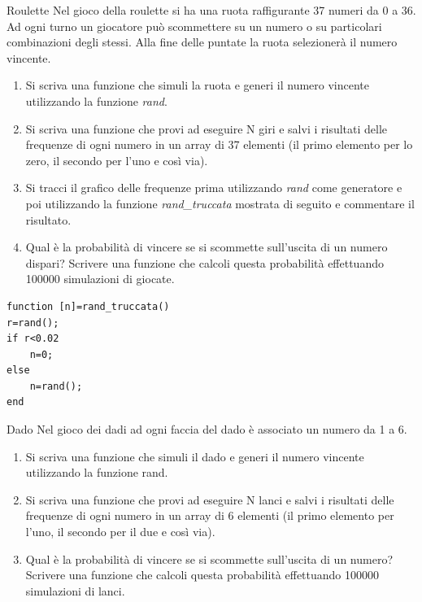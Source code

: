 \documentclass[format=169]{beamer}
\begin{document}
\begin{frame}{Roulette}
	Nel gioco della roulette si ha una ruota raffigurante 37
	numeri da 0 a 36. Ad ogni turno un giocatore può
	scommettere su un numero o su particolari combinazioni
	degli stessi. Alla fine delle puntate la ruota selezionerà il
	numero vincente.
	
	\begin{enumerate}
		\item Si scriva una funzione che simuli la ruota e generi il
		numero vincente utilizzando la funzione \emph{rand}.
		\item Si scriva una funzione che provi ad eseguire N giri e salvi
		i risultati delle frequenze di ogni numero in un array di
		37 elementi (il primo elemento per lo zero, il secondo per
		l'uno e così via).
		\item Si tracci il grafico delle frequenze prima utilizzando
		\emph{rand} come generatore e poi utilizzando la funzione
		\emph{rand\_truccata} mostrata di seguito e commentare il
		risultato.
		\item Qual è la probabilità di vincere se si scommette
		sull'uscita di un numero dispari? Scrivere una funzione
		che calcoli questa probabilità effettuando 100000
		simulazioni di giocate.
	\end{enumerate}
	
	\framebreak
\begin{lstlisting}[style=matlab]
function [n]=rand_truccata()
r=rand();
if r<0.02
    n=0;
else
    n=rand();
end
\end{lstlisting}
\end{frame}

\begin{frame}{Dado}
	Nel gioco dei dadi ad ogni faccia del dado è associato un
	numero da 1 a 6.
	
	\begin{enumerate}
		\item Si scriva una funzione che simuli il dado e generi il
		numero vincente utilizzando la funzione rand.
		\item Si scriva una funzione che provi ad eseguire N lanci e
		salvi i risultati delle frequenze di ogni numero in un array
		di 6 elementi (il primo elemento per l’uno, il secondo per
		il due e così via).
		\item Qual è la probabilità di vincere se si scommette
		sull'uscita di un numero? Scrivere una funzione che
		calcoli questa probabilità effettuando 100000 simulazioni
		di lanci.
	\end{enumerate}
\end{frame}

\end{document}
